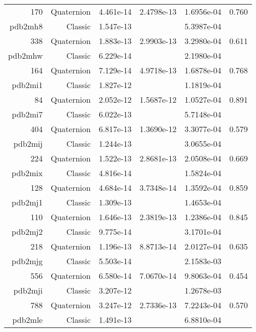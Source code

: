 \begin{xltabular}{\textwidth}{r|rS[table-format=1.3e+2]S[table-format=1.4e+2]S[table-format=1.4e+2]S[table-format=-1.3]}
170 & Quaternion & 4.461e-14 & 2.4798e-13 & 1.6956e-04 & 0.760\\  \addlinespace
{\color{red} pdb2mh8 } & Classic & 1.547e-13 &  & 5.3987e-04 & \\
338 & Quaternion & 1.883e-13 & 2.9903e-13 & 3.2980e-04 & 0.611\\  \addlinespace
{\color{red} pdb2mhw } & Classic & 6.229e-14 &  & 2.1980e-04 & \\
164 & Quaternion & 7.129e-14 & 4.9718e-13 & 1.6878e-04 & 0.768\\  \addlinespace
{\color{red} pdb2mi1 } & Classic & 1.827e-12 &  & 1.1819e-04 & \\
84 & Quaternion & 2.052e-12 & 1.5687e-12 & 1.0527e-04 & 0.891\\  \addlinespace
{\color{red} pdb2mi7 } & Classic & 6.022e-13 &  & 5.7148e-04 & \\
404 & Quaternion & 6.817e-13 & 1.3690e-12 & 3.3077e-04 & 0.579\\  \addlinespace
{\color{red} pdb2mij } & Classic & 1.244e-13 &  & 3.0655e-04 & \\
224 & Quaternion & 1.522e-13 & 2.8681e-13 & 2.0508e-04 & 0.669\\  \addlinespace
{\color{red} pdb2mix } & Classic & 4.816e-14 &  & 1.5824e-04 & \\
128 & Quaternion & 4.684e-14 & 3.7348e-14 & 1.3592e-04 & 0.859\\  \addlinespace
{\color{red} pdb2mj1 } & Classic & 1.309e-13 &  & 1.4653e-04 & \\
110 & Quaternion & 1.646e-13 & 2.3819e-13 & 1.2386e-04 & 0.845\\  \addlinespace
{\color{red} pdb2mj2 } & Classic & 9.775e-14 &  & 3.1701e-04 & \\
218 & Quaternion & 1.196e-13 & 8.8713e-14 & 2.0127e-04 & 0.635\\  \addlinespace
{\color{red} pdb2mjg } & Classic & 5.503e-14 &  & 2.1583e-03 & \\
556 & Quaternion & 6.580e-14 & 7.0670e-14 & 9.8063e-04 & 0.454\\  \addlinespace
{\color{red} pdb2mji } & Classic & 3.207e-12 &  & 1.2678e-03 & \\
788 & Quaternion & 3.247e-12 & 2.7336e-13 & 7.2243e-04 & 0.570\\  \addlinespace
{\color{red} pdb2mle } & Classic & 1.491e-13 &  & 6.8810e-04 & \\

\end{xltabular}
